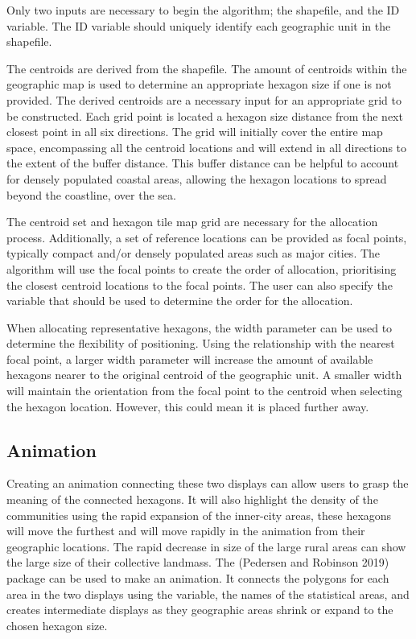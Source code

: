 Only two inputs are necessary to begin the algorithm; the shapefile, and the ID variable. The ID variable should uniquely identify each geographic unit in the shapefile.

The centroids are derived from the shapefile. The amount of centroids within the geographic map is used to determine an appropriate hexagon size if one is not provided. The derived centroids are a necessary input for an appropriate grid to be constructed. Each grid point is located a hexagon size distance from the next closest point in all six directions. The grid will initially cover the entire map space, encompassing all the centroid locations and will extend in all directions to the extent of the buffer distance. This buffer distance can be helpful to account for densely populated coastal areas, allowing the hexagon locations to spread beyond the coastline, over the sea.

The centroid set and hexagon tile map grid are necessary for the allocation process. Additionally, a set of reference locations can be provided as focal points, typically compact and/or densely populated areas such as major cities. The algorithm will use the focal points to create the order of allocation, prioritising the closest centroid locations to the focal points. The user can also specify the variable that should be used to determine the order for the allocation.

When allocating representative hexagons, the width parameter can be used to determine the flexibility of positioning. Using the relationship with the nearest focal point, a larger width parameter will increase the amount of available hexagons nearer to the original centroid of the geographic unit. A smaller width will maintain the orientation from the focal point to the centroid when selecting the hexagon location. However, this could mean it is placed further away.

\hypertarget{animation}{%
\subsection{Animation}\label{animation}}

Creating an animation connecting these two displays can allow users to grasp the meaning of the connected hexagons. It will also highlight the density of the communities using the rapid expansion of the inner-city areas, these hexagons will move the furthest and will move rapidly in the animation from their geographic locations. The rapid decrease in size of the large rural areas can show the large size of their collective landmass. The  (Pedersen and Robinson 2019) package can be used to make an animation. It connects the polygons for each area in the two displays using the  variable, the names of the statistical areas, and creates intermediate displays as they geographic areas shrink or expand to the chosen hexagon size.

